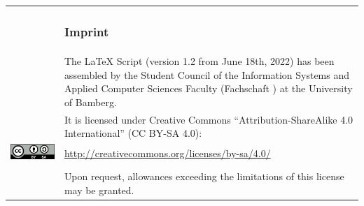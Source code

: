 \thispagestyle{empty}



\newpage
\thispagestyle{empty}

\mbox{}
\vfill

\begin{tabular}{@{}lp{9cm}}
	& \subsubsection*{Imprint} \\
	& The \LaTeX{} Script (version 1.2 from June 18th, 2022) has been assembled by the Student Council of the Information Systems and Applied Computer Sciences Faculty (Fachschaft \acro{WIAI}) at the University of Bamberg. \\
	& It is licensed under Creative Commons \enquote{Attribution-ShareAlike 4.0 International} (CC BY-SA 4.0): \\
	\href{http://creativecommons.org/licenses/by-sa/4.0/}{\includegraphics[height=.5cm]{graphics/cc-by-sa}} & \url{http://creativecommons.org/licenses/by-sa/4.0/} \\ \\
	& Upon request, allowances exceeding the limitations of this license may be granted.
\end{tabular}
